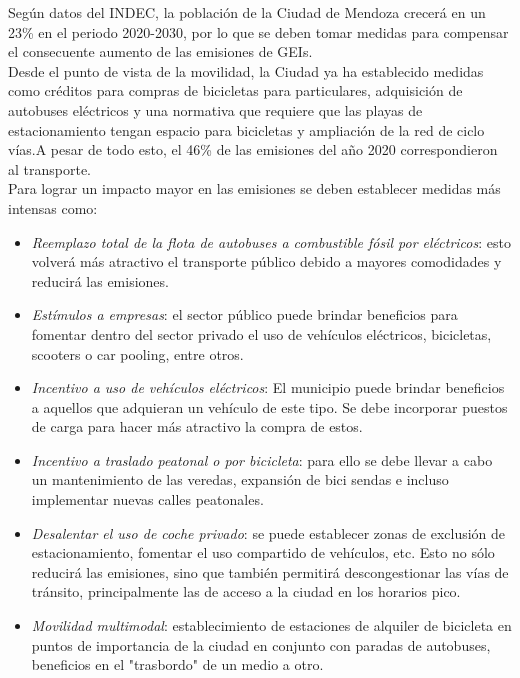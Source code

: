 \documentclass[runningheads]{llncs}
\begin{document}
Según datos del INDEC, la población de la Ciudad de Mendoza crecerá en un 23\% en el periodo 2020-2030, por lo que se deben tomar medidas para compensar el consecuente aumento de las emisiones de GEIs.~\cite{ref_url12}\\

Desde el punto de vista de la movilidad, la Ciudad ya ha establecido medidas como créditos para compras de bicicletas para particulares, adquisición de autobuses eléctricos y una normativa que requiere que las playas de estacionamiento tengan espacio para bicicletas y ampliación de la red de ciclo vías.A pesar de todo esto, el 46\% de las emisiones del año 2020 correspondieron al transporte.~\cite{ref_url13}\\


Para lograr un impacto mayor en las emisiones se deben establecer medidas más intensas como:

\begin{itemize}
    \item \textit{Reemplazo total de la flota de autobuses a combustible fósil por eléctricos}: esto volverá más atractivo el transporte público debido a mayores comodidades y reducirá las emisiones.
    
    \item \textit{Estímulos a empresas}: el sector público puede brindar beneficios para fomentar dentro del sector privado el uso de vehículos eléctricos, bicicletas, scooters o car pooling, entre otros.

    \item \textit{Incentivo a uso de vehículos eléctricos}: El municipio puede brindar beneficios a aquellos que adquieran un vehículo de este tipo. Se debe incorporar puestos de carga para hacer más atractivo la compra de estos.

    \item \textit{Incentivo a traslado peatonal o por bicicleta}: para ello se debe llevar a cabo un mantenimiento de las veredas, expansión de bici sendas e incluso implementar nuevas calles peatonales.

    \item \textit{Desalentar el uso de coche privado}: se puede establecer zonas de exclusión de estacionamiento, fomentar el uso compartido de vehículos, etc. Esto no sólo reducirá las emisiones, sino que también permitirá descongestionar las vías de tránsito, principalmente las de acceso a la ciudad en los horarios pico.

    \item \textit{Movilidad multimodal}: establecimiento de estaciones de alquiler de bicicleta en puntos de importancia de la ciudad en conjunto con paradas de autobuses, beneficios en el "trasbordo" de un medio a otro.
\end{itemize}
\end{document}
